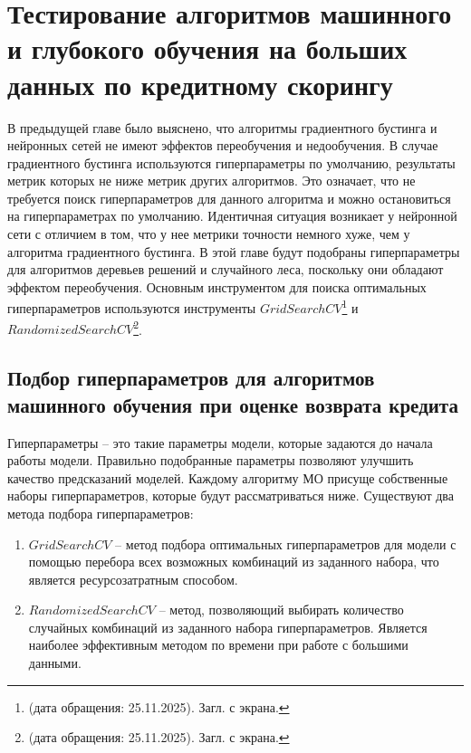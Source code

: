 \chapter{Тестирование алгоритмов машинного и глубокого обучения на больших данных по кредитному скорингу}

В предыдущей главе было выяснено, что алгоритмы градиентного бустинга и нейронных сетей не имеют эффектов переобучения и недообучения. В случае градиентного бустинга используются гиперпараметры по умолчанию, результаты метрик которых не ниже метрик других алгоритмов. Это означает, что не требуется поиск гиперпараметров для данного алгоритма и можно остановиться на гиперпараметрах по умолчанию. Идентичная ситуация возникает у нейронной сети с отличием в том, что у нее метрики точности немного хуже, чем у алгоритма градиентного бустинга. В этой главе будут подобраны гиперпараметры для алгоритмов деревьев решений и случайного леса, поскольку они обладают эффектом переобучения. Основным инструментом для поиска оптимальных гиперпараметров используются инструменты $GridSearchCV$\footnote{\cite{GridSearchCV} (дата обращения: 25.11.2025). Загл. с экрана.} и $RandomizedSearchCV$\footnote{\cite{RandomizedSearchCV} (дата обращения: 25.11.2025). Загл. с экрана.}.

\section{Подбор гиперпараметров для алгоритмов машинного обучения при оценке возврата кредита}

Гиперпараметры -- это такие параметры модели, которые задаются до начала работы модели. Правильно подобранные параметры позволяют улучшить качество предсказаний моделей. Каждому алгоритму МО присуще собственные наборы гиперпараметров, которые будут рассматриваться ниже. Существуют два метода подбора гиперпараметров:

\begin{enumerate}[nosep]
	\item $GridSearchCV$ -- метод подбора оптимальных гиперпараметров для модели с помощью перебора всех возможных комбинаций из заданного набора, что является ресурсозатратным способом.
	\item $RandomizedSearchCV$ -- метод, позволяющий выбирать количество случайных комбинаций из заданного набора гиперпараметров. Является наиболее эффективным методом по времени при работе с большими данными.
\end{enumerate}

